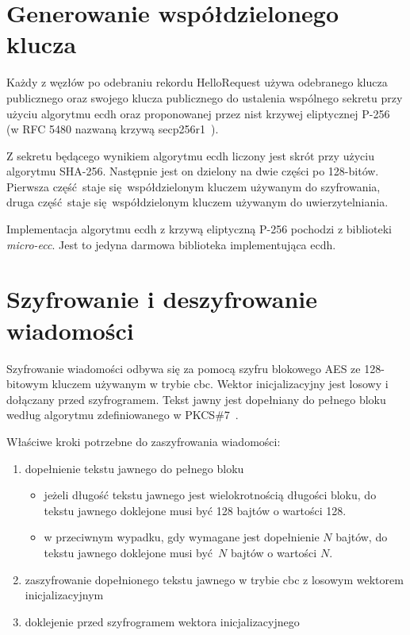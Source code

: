 \section{Generowanie współdzielonego klucza}
\label{sec:sharedkey}

Każdy z węzłów po odebraniu rekordu HelloRequest używa odebranego klucza publicznego oraz swojego klucza publicznego do ustalenia wspólnego sekretu przy użyciu algorytmu \gls{ecdh} oraz proponowanej przez \gls{nist} krzywej eliptycznej P-256~\cite{kerry2013digital} (w RFC 5480 nazwaną krzywą secp256r1~\cite{turner2009elliptic}).

Z sekretu będącego wynikiem algorytmu \gls{ecdh} liczony jest skrót przy użyciu algorytmu SHA-256. Następnie jest on dzielony na dwie części po 128-bitów. Pierwsza część staje się współdzielonym kluczem używanym do szyfrowania, druga część staje się współdzielonym kluczem używanym do uwierzytelniania.

Implementacja algorytmu \gls{ecdh} z krzywą eliptyczną P-256 pochodzi z biblioteki \emph{micro-ecc}. Jest to jedyna darmowa biblioteka implementująca \gls{ecdh}.

\section{Szyfrowanie i deszyfrowanie wiadomości}
\label{sec:encrypt}

Szyfrowanie wiadomości odbywa się za pomocą szyfru blokowego AES ze 128-bitowym kluczem używanym w trybie \gls{cbc}. Wektor inicjalizacyjny jest losowy i dołączany przed szyfrogramem. Tekst jawny jest dopełniany do pełnego bloku według algorytmu zdefiniowanego w PKCS\#7~\cite{kaliski1998pkcs}.

Właściwe kroki potrzebne do zaszyfrowania wiadomości:

\begin{enumerate}
\item dopełnienie tekstu jawnego do pełnego bloku
\begin{itemize} 
\item jeżeli długość tekstu jawnego jest wielokrotnością długości bloku, do tekstu jawnego doklejone musi być 128 bajtów o wartości 128.
\item w przeciwnym wypadku, gdy wymagane jest dopełnienie $ N $ bajtów, do tekstu jawnego doklejone musi być $ N $ bajtów o wartości $ N $.
\end{itemize}
\item zaszyfrowanie dopełnionego tekstu jawnego w trybie \gls{cbc} z losowym wektorem inicjalizacyjnym
\item doklejenie przed szyfrogramem wektora inicjalizacyjnego
\end{enumerate}

